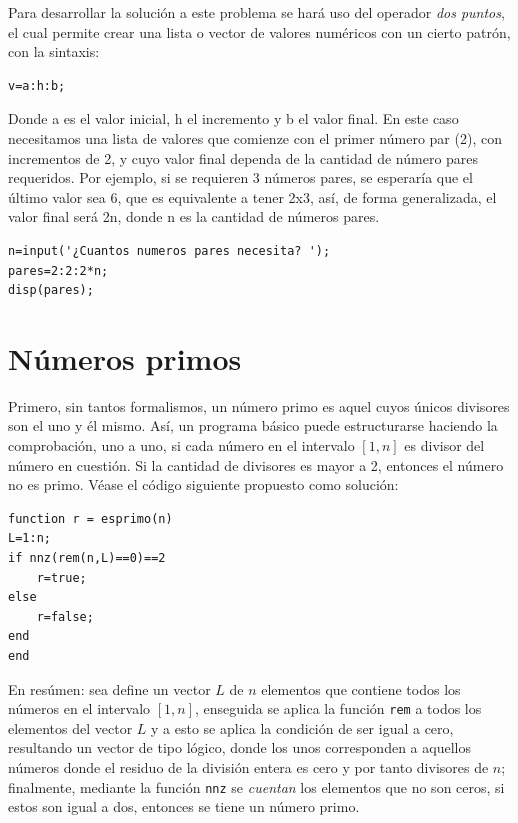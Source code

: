 \sol

Para desarrollar la solución a este problema se hará uso del operador {\it dos puntos}, el cual 
permite crear una lista o vector de valores numéricos con un cierto patrón, con la sintaxis:

\begin{verbatim}
v=a:h:b;
\end{verbatim}

Donde a es el valor inicial, h el incremento y b el valor final. En este caso necesitamos una lista 
de valores que comienze con el primer número par (2), con incrementos de 2, y cuyo valor final dependa 
de la cantidad de número pares requeridos. Por ejemplo, si se requieren 3 números pares, se esperaría que 
el último valor sea 6, que es equivalente a tener 2x3, así, de forma generalizada, el valor final será 
2n, donde n es la cantidad de números pares.

\begin{verbatim}
n=input('¿Cuantos numeros pares necesita? ');
pares=2:2:2*n;
disp(pares);
\end{verbatim}


\section{Números primos} 


\sol

Primero, sin tantos formalismos, un número primo es aquel cuyos únicos divisores son el uno y él mismo. 
Así, un programa básico puede estructurarse haciendo la comprobación, uno a uno, si cada número en el intervalo 
$[1, n]$ es divisor del número en cuestión. Si la cantidad de divisores es mayor a 2, entonces el número 
no es primo. Véase el código siguiente propuesto como solución:

\begin{verbatim}
function r = esprimo(n)
L=1:n;
if nnz(rem(n,L)==0)==2
    r=true;
else
    r=false;
end
end
\end{verbatim}

En resúmen: sea define un vector $L$ de $n$ elementos que contiene todos los números en el intervalo $[1,n]$, 
enseguida se aplica la función {\tt rem} a todos los elementos del vector $L$ y a esto se aplica la condición 
de ser igual a cero, resultando un vector de tipo lógico, donde los unos corresponden a aquellos números donde 
el residuo de la división entera es cero y por tanto divisores de $n$; finalmente, mediante la función 
{\tt nnz} se {\it cuentan} los elementos que no son ceros, si estos son igual a dos, entonces se tiene un 
número primo.

